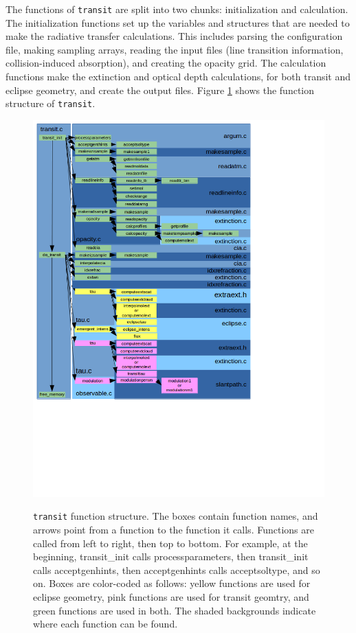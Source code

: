 \documentclass[letterpaper,12pt]{article}
\begin{document}
The functions of {\tt transit} are split into two chunks: initialization and calculation. The initialization functions set up the variables and structures that are needed to make the radiative transfer calculations. This includes parsing the configuration file, making sampling arrays, reading the input files (line transition information, collision-induced absorption), and creating the opacity grid. The calculation functions make the extinction and optical depth calculations, for both transit and eclipse geometry, and create the output files. Figure \ref{fig:codediagram} shows the function structure of {\tt transit}.

\begin{figure}
\includegraphics[trim={0 2.9in 0 0},clip]{fig/transit_diagram}
\label{fig:codediagram}
\caption{{\tt transit} function structure. The boxes contain function names, and arrows point from a function to the function it calls. Functions are called from left to right, then top to bottom. For example, at the beginning, transit\_init calls processparameters, then transit\_init calls acceptgenhints, then acceptgenhints calls acceptsoltype, and so on. Boxes are color-coded as follows:  yellow functions are used for eclipse geometry, pink functions are used for transit geomtry, and green functions are used in both. The shaded backgrounds indicate where each function can be found.}
\end{figure}
\end{document}
